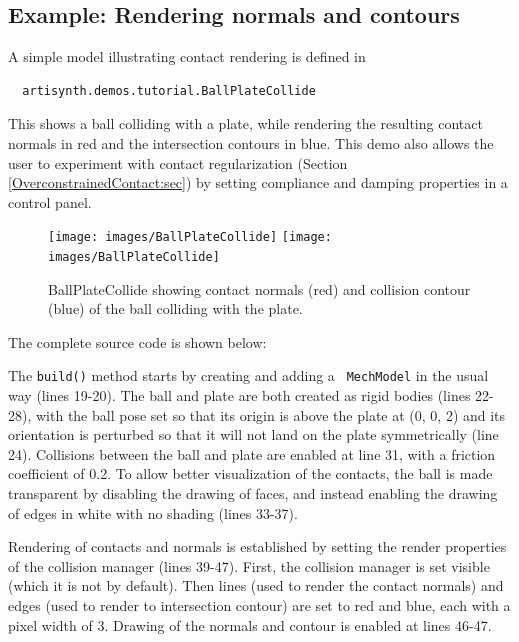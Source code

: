 \subsection{Example: Rendering normals and contours}
\label{RenderingContactNormals:sec}

A simple model illustrating contact rendering is defined in
%
\begin{verbatim}
  artisynth.demos.tutorial.BallPlateCollide
\end{verbatim}
%
This shows a ball colliding with a plate, while rendering the
resulting contact normals in red and the intersection contours in
blue. This demo also allows the user to experiment with contact
regularization (Section \ref{OverconstrainedContact:sec}) by setting
{\sf compliance} and {\sf damping} properties in a control panel.

\begin{figure}[ht]
\begin{center}
\iflatexml
 \texttt{[image: images/BallPlateCollide]}
\else
 \texttt{[image: images/BallPlateCollide]}
\fi
\end{center}
\caption{BallPlateCollide showing contact normals (red) and collision contour
(blue) of the ball colliding with the plate.}
\label{BallPlateCollide:fig}
\end{figure}

The complete source code is shown below:
%
\lstset{numbers=left}

\lstset{numbers=none}

The {\tt build()} method starts by creating and adding a {\tt
MechModel} in the usual way (lines 19-20). The ball and plate are both
created as rigid bodies (lines 22-28), with the ball pose set so that
its origin is above the plate at (0, 0, 2) and its orientation is
perturbed so that it will not land on the plate symmetrically (line
24). Collisions between the ball and plate are enabled at line 31, with
a friction coefficient of 0.2. To allow better visualization of the
contacts, the ball is made transparent by disabling the drawing of
faces, and instead enabling the drawing of edges in white with no
shading (lines 33-37).

Rendering of contacts and normals is established by setting the render
properties of the collision manager (lines 39-47). First, the
collision manager is set visible (which it is not by default).  Then
lines (used to render the contact normals) and edges (used to render
to intersection contour) are set to red and blue, each with a pixel
width of 3.  Drawing of the normals and contour is enabled at lines
46-47.

